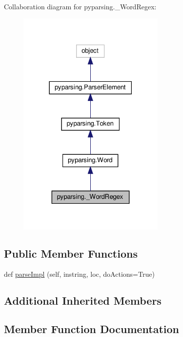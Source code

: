 Collaboration diagram for pyparsing.\+\_\+\+Word\+Regex\+:
\nopagebreak
\begin{figure}[H]
\begin{center}
\leavevmode
\includegraphics[width=206pt]{classpyparsing_1_1__WordRegex__coll__graph}
\end{center}
\end{figure}
\subsection*{Public Member Functions}
\begin{DoxyCompactItemize}
\item 
def \hyperlink{classpyparsing_1_1__WordRegex_a000544fdcb00b679be08bd54cd56647a}{parse\+Impl} (self, instring, loc, do\+Actions=True)
\end{DoxyCompactItemize}
\subsection*{Additional Inherited Members}


\subsection{Member Function Documentation}
\mbox{\label{classpyparsing_1_1__WordRegex_a000544fdcb00b679be08bd54cd56647a}} 
